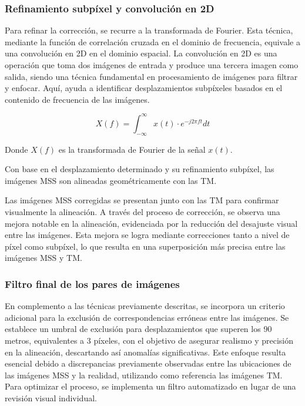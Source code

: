             \subsubsection{Refinamiento subpíxel y convolución en 2D}
                Para refinar la corrección, se recurre a la transformada de Fourier. Esta técnica, mediante la función de correlación cruzada en el dominio de frecuencia, equivale a una convolución en 2D en el dominio espacial. La convolución en 2D es una operación que toma dos imágenes de entrada y produce una tercera imagen como salida, siendo una técnica fundamental en procesamiento de imágenes para filtrar y enfocar. Aquí, ayuda a identificar desplazamientos subpíxeles basados en el contenido de frecuencia de las imágenes.
                
                \begin{equation}
                    X(f) = \int_{-\infty}^{\infty} x(t) \cdot e^{-j2\pi ft} dt
                \end{equation}
            
                Donde \(X(f)\) es la transformada de Fourier de la señal \(x(t)\).
                
                
                Con base en el desplazamiento determinado y su refinamiento subpíxel, las imágenes MSS son alineadas geométricamente con las TM.
                
                Las imágenes MSS corregidas se presentan junto con las TM para confirmar visualmente la alineación. A través del proceso de corrección, se observa una mejora notable en la alineación, evidenciada por la reducción del desajuste visual entre las imágenes. Esta mejora se logra mediante correcciones tanto a nivel de píxel como subpíxel, lo que resulta en una superposición más precisa entre las imágenes MSS y TM.
                
                
                
            \subsubsection{Filtro final de los pares de imágenes}
                En complemento a las técnicas previamente descritas, se incorpora un criterio adicional para la exclusión de correspondencias erróneas entre las imágenes. Se establece un umbral de exclusión para desplazamientos que superen los 90 metros, equivalentes a 3 píxeles, con el objetivo de asegurar realismo y precisión en la alineación, descartando así anomalías significativas. Este enfoque resulta esencial debido a discrepancias previamente observadas entre las ubicaciones de las imágenes MSS y la realidad, utilizando como referencia las imágenes TM. Para optimizar el proceso, se implementa un filtro automatizado en lugar de una revisión visual individual.

